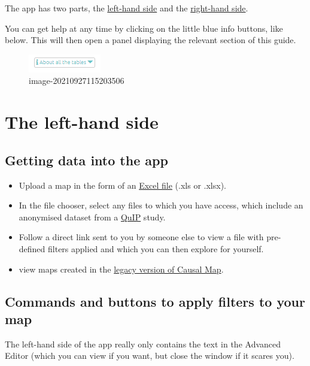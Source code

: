 \documentclass[
]{book}
\providecommand{\tightlist}{%
  \setlength{\itemsep}{0pt}\setlength{\parskip}{0pt}}
\begin{document}
The app has two parts, the \protect\hyperlink{xlhs}{left-hand side} and the \protect\hyperlink{rhs}{right-hand side}.

You can get help at any time by clicking on the little blue info buttons, like below. This will then open a panel displaying the relevant section of this guide.

\begin{figure}
\centering
\includegraphics{_assets/image-20210927115203506.png}
\caption{image-20210927115203506}
\end{figure}

\hypertarget{xlhs}{%
\section{The left-hand side}\label{xlhs}}

\hypertarget{getting-data-into-the-app}{%
\subsection{Getting data into the app}\label{getting-data-into-the-app}}

\begin{itemize}
\tightlist
\item
  Upload a map in the form of an \protect\hyperlink{xuploading-and-updating}{Excel file} (.xls or .xlsx).
\item
  In the file chooser, select any files to which you have access, which include an anonymised dataset from a \href{http://bathsdr.org/}{QuIP} study.
\item
  Follow a direct link sent to you by someone else to view a file with pre-defined filters applied and which you can then explore for yourself.
\item
  view maps created in the \href{http://causalmap.app/}{legacy version of Causal Map}.
\end{itemize}

\hypertarget{commands-and-buttons-to-apply-filters-to-your-map}{%
\subsection{Commands and buttons to apply filters to your map}\label{commands-and-buttons-to-apply-filters-to-your-map}}

The left-hand side of the app really only contains the text in the Advanced Editor (which you can view if you want, but close the window if it scares you).
\end{document}
